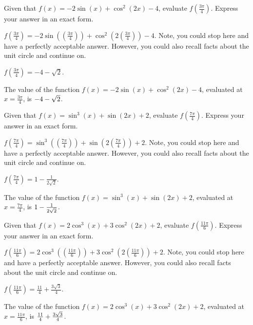 \begin{shuffle}
\begin{exercise}
Given that $f(x)=-2 \sin (x)+\cos ^2(2 x)-4$, evaluate $f\left(\frac{3 \pi }{4}\right)$. Express your answer in an exact form.
\begin{solution}
\begin{hint}
$f\left(\frac{3 \pi }{4}\right)=-2 \sin (\left(\frac{3 \pi }{4}\right))+\cos ^2(2 \left(\frac{3 \pi }{4}\right))-4$. Note, you could stop here and have a perfectly acceptable answer. However, you could also recall facts about the unit circle and continue on. 
\end{hint}
\begin{hint}
$f\left(\frac{3 \pi }{4}\right)=-4-\sqrt{2}$.
\end{hint}
The value of the function $f(x) = -2 \sin (x)+\cos ^2(2 x)-4$, evaluated at $x=\frac{3 \pi }{4}$, is ${-4-\sqrt{2}}$.
\end{solution}
\end{exercise}

\begin{exercise}
Given that $f(x)=\sin ^3(x)+\sin (2 x)+2$, evaluate $f\left(\frac{7 \pi }{4}\right)$. Express your answer in an exact form.
\begin{solution}
\begin{hint}
$f\left(\frac{7 \pi }{4}\right)=\sin ^3(\left(\frac{7 \pi }{4}\right))+\sin (2 \left(\frac{7 \pi }{4}\right))+2$. Note, you could stop here and have a perfectly acceptable answer. However, you could also recall facts about the unit circle and continue on. 
\end{hint}
\begin{hint}
$f\left(\frac{7 \pi }{4}\right)=1-\frac{1}{2 \sqrt{2}}$.
\end{hint}
The value of the function $f(x) = \sin ^3(x)+\sin (2 x)+2$, evaluated at $x=\frac{7 \pi }{4}$, is ${1-\frac{1}{2 \sqrt{2}}}$.
\end{solution}
\end{exercise}

\begin{exercise}
Given that $f(x)=2 \cos ^3(x)+3 \cos ^2(2 x)+2$, evaluate $f\left(\frac{11 \pi }{6}\right)$. Express your answer in an exact form.
\begin{solution}
\begin{hint}
$f\left(\frac{11 \pi }{6}\right)=2 \cos ^3(\left(\frac{11 \pi }{6}\right))+3 \cos ^2(2 \left(\frac{11 \pi }{6}\right))+2$. Note, you could stop here and have a perfectly acceptable answer. However, you could also recall facts about the unit circle and continue on. 
\end{hint}
\begin{hint}
$f\left(\frac{11 \pi }{6}\right)=\frac{11}{4}+\frac{3 \sqrt{3}}{4}$.
\end{hint}
The value of the function $f(x) = 2 \cos ^3(x)+3 \cos ^2(2 x)+2$, evaluated at $x=\frac{11 \pi }{6}$, is ${\frac{11}{4}+\frac{3 \sqrt{3}}{4}}$.
\end{solution}
\end{exercise}


\end{shuffle}
